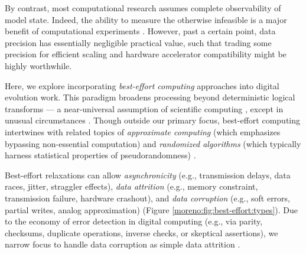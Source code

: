 By contrast, most computational research assumes complete observability of model state.
Indeed, the ability to measure the otherwise infeasible is a major benefit of computational experiments \cite{lenski2003evolutionary}.
However, past a certain point, data precision has essentially negligible practical value, such that trading some precision for efficient scaling and hardware accelerator compatibility might be highly worthwhile.



Here, we explore incorporating \textit{best-effort computing} approaches into digital evolution work.
This paradigm broadens processing beyond deterministic logical transforms --- a near-universal assumption of scientific computing \cite{chakradhar2010best,rinard2012unsynchronized}, except in unusual circumstances \cite{desell2009robust}.
Though outside our primary focus, best-effort computing intertwines with related topics of \textit{approximate computing} (which emphasizes bypassing non-essential computation) and \textit{randomized algorithms} (which typically harness statistical properties of pseudorandomness) \cite{Buluc2021,mittal2016survey,menon2023approximate}.

Best-effort relaxations can allow \textit{asynchronicity} (e.g., transmission delays, data races, jitter, straggler effects), \textit{data attrition} (e.g., memory constraint, transmission failure, hardware crashout), and \textit{data corruption} (e.g., soft errors, partial writes, analog approximation) (Figure \ref{moreno:fig:best-effort:types}).
Due to the economy of error detection in digital computing \cite{hamming1950error} (e.g., via parity, checksums, duplicate operations, inverse checks, or skeptical assertions), we narrow focus to handle data corruption as simple data attrition \cite{ackley2013beyond}.

